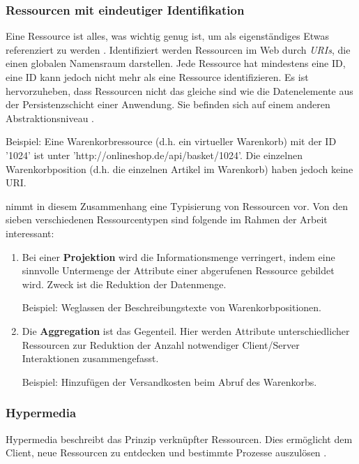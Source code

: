 \documentclass[11pt, a4paper, titlepage, listof=totoc, bibliography=totoc, index=totoc, twoside, openright, headings=normal]{scrreprt}
\begin{document}
\subsubsection*{Ressourcen mit eindeutiger Identifikation}
\glqq Eine Ressource ist alles, was wichtig genug ist, um als eigenständiges Etwas referenziert zu werden\grqq{} \citep{richardson07}. Identifiziert werden Ressourcen im Web durch \emph{\ac{URI}s}, die einen globalen Namensraum darstellen. Jede Ressource hat mindestens eine ID, eine ID kann jedoch nicht mehr als eine Ressource identifizieren. Es ist hervorzuheben, dass Ressourcen nicht das gleiche sind wie die Datenelemente aus der Persistenzschicht einer Anwendung. Sie befinden sich auf einem anderen Abstraktionsniveau \citep{tilkov11}.\vspace{0.3em}

Beispiel: Eine Warenkorbressource (d.h. ein virtueller Warenkorb) mit der ID '1024' ist unter 'http://onlineshop.de/api/basket/1024'. Die einzelnen Warenkorbposition (d.h. die einzelnen Artikel im Warenkorb) haben jedoch keine URI.

\citet{tilkov11} nimmt in diesem Zusammenhang eine Typisierung von Ressourcen vor. Von den sieben verschiedenen Ressourcentypen sind folgende im Rahmen der Arbeit interessant:
\begin{enumerate}
\item Bei einer \textbf{Projektion} wird die Informationsmenge verringert, indem eine sinnvolle Untermenge der Attribute einer abgerufenen Ressource gebildet wird. Zweck ist die Reduktion der Datenmenge.\vspace{0.2em}

Beispiel: Weglassen der Beschreibungstexte von Warenkorbpositionen.
\item Die \textbf{Aggregation} ist das Gegenteil. Hier werden Attribute unterschiedlicher Ressourcen zur Reduktion der Anzahl notwendiger Client/Server Interaktionen zusammengefasst.\vspace{0.2em}

Beispiel: Hinzufügen der Versandkosten beim Abruf des Warenkorbs.
\end{enumerate}
\subsubsection*{Hypermedia}
Hypermedia beschreibt das Prinzip verknüpfter Ressourcen. Dies ermöglicht dem Client, neue Ressourcen zu entdecken und bestimmte Prozesse auszulösen \citep{wilde11}.
\end{document}
